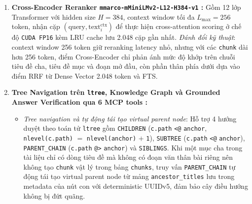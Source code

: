 \begin{enumerate}
\begin{itemize}
    \end{itemize}
    \item \textbf{Cross-Encoder Reranker \texttt{mmarco-mMiniLMv2-L12-H384-v1} \cite{wang2021minilm}:} Gồm 12 lớp Transformer với hidden size $H = 384$, context window tối đa $L_{\max} = 256$ token, nhận cặp $(\text{query}, \text{text}^{\text{ctx}}_i)$ để thực hiện cross-attention scoring ở chế độ \texttt{CUDA FP16} kèm LRU cache lưu 2.048 cặp gần nhất. \textit{Đánh đổi kỹ thuật}: context window 256 token giữ reranking latency nhỏ, nhưng với các \texttt{chunk} dài hơn 256 token, điểm Cross-Encoder chỉ phản ánh mức độ khớp trên chuỗi tiêu đề cha, tiêu đề mục và đoạn mở đầu, còn phần thân phía dưới dựa vào điểm RRF từ Dense Vector 2.048 token và FTS.
    \item \textbf{Tree Navigation trên \texttt{ltree}, Knowledge Graph và Grounded Answer Verification qua 6 MCP tools \cite{anthropic2024mcp}:}
    \begin{itemize}
        \item \textit{Tree navigation và tự động tái tạo virtual parent node}: Hỗ trợ 4 hướng duyệt theo toán tử \texttt{ltree} gồm \texttt{CHILDREN} (\texttt{c.path} \texttt{<@} \texttt{anchor}, \texttt{nlevel(c.path)} $=$ \texttt{nlevel(anchor)} $+$ \texttt{1}), \texttt{SUBTREE} (\texttt{c.path} \texttt{<@} \texttt{anchor}), \texttt{PARENT\_\allowbreak CHAIN} (\texttt{c.path} \texttt{@>} \texttt{anchor}) và \texttt{SIBLINGS}. Khi một mục cha trong tài liệu chỉ có dòng tiêu đề mà không có đoạn văn thân bài riêng nên không tạo \texttt{chunk} vật lý trong bảng \texttt{chunks}, truy vấn \texttt{PARENT\_\allowbreak CHAIN} tự động tái tạo virtual parent node từ mảng \texttt{ancestor\_\allowbreak titles} lưu trong metadata của nút con với deterministic UUIDv5, đảm bảo cây điều hướng không bị đứt quãng.

\end{itemize}
\end{enumerate}

